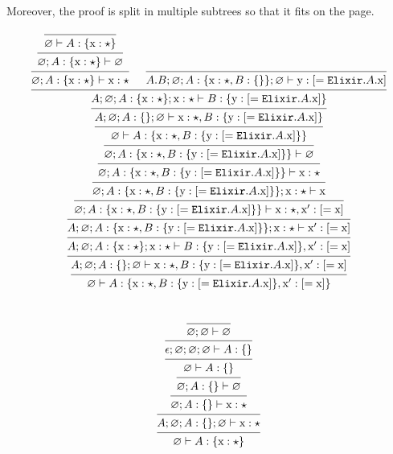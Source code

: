 \documentclass[12pt]{article}
\newcommand{\tx}{\text{\rm x}}
\newcommand{\ty}{\text{\rm y}}
\newcommand{\emptyenv}{\varnothing}
\newcommand{\Elixir}{\texttt{Elixir}}
\begin{document}
Moreover, the proof is split in multiple subtrees so that it fits on the page.

\[
    \begin{prooftree}
        \infer0{ \emptyenv \vdash A : \{ \tx : \star \} }
        \infer1{ \emptyenv; A : \{ \tx : \star \} \vdash \emptyenv }
        \infer1{ \emptyenv; A : \{ \tx : \star \} \vdash \tx : \star }

        \infer0{ A.B; \emptyenv; A : \{ \tx : \star, B : \{\} \}; \emptyenv \vdash \ty : [= \Elixir.A.\tx] }

        \infer2{ A; \emptyenv; A : \{ \tx : \star \}; \tx : \star \vdash B : \{ \ty : [= \Elixir.A.\tx] \} }
        \infer1{ A; \emptyenv; A : \{ \}; \emptyenv \vdash \tx : \star, B : \{ \ty : [= \Elixir.A.\tx] \} }
        \infer1{ \emptyenv \vdash A : \{ \tx : \star, B : \{ \ty : [= \Elixir.A.\tx] \} \} }
        \infer1{ \emptyenv; A : \{ \tx : \star, B : \{ \ty : [= \Elixir.A.\tx] \} \} \vdash \emptyenv }
        \infer1{ \emptyenv; A : \{ \tx : \star, B : \{ \ty : [= \Elixir.A.\tx] \} \} \vdash \tx : \star }
        \infer1{ \emptyenv; A : \{ \tx : \star, B : \{ \ty : [= \Elixir.A.\tx] \} \}; \tx : \star \vdash \tx}
        \infer1{ \emptyenv; A : \{ \tx : \star, B : \{ \ty : [= \Elixir.A.\tx] \} \} \vdash \tx : \star, \tx' : [= \tx] }
        \infer1{ A; \emptyenv; A : \{ \tx : \star, B : \{ \ty : [= \Elixir.A.\tx] \} \}; \tx : \star \vdash \tx' : [= \tx] }
        \infer1{ A; \emptyenv; A : \{ \tx : \star \}; \tx : \star \vdash B : \{ \ty : [= \Elixir.A.\tx] \}, \tx' : [= \tx] }
        \infer1{ A; \emptyenv; A : \{\}; \emptyenv \vdash  \tx : \star, B : \{ \ty : [= \Elixir.A.\tx] \}, \tx' : [= \tx] }
        \infer1{ \emptyenv \vdash A : \{ \tx : \star, B : \{ \ty : [= \Elixir.A.\tx] \}, \tx' : [= \tx] \} }
    \end{prooftree}
\] \\

\[
    \begin{prooftree}
        \infer0{ \emptyenv; \emptyenv \vdash \emptyenv }
        \infer1{ \epsilon; \emptyenv; \emptyenv; \emptyenv \vdash  A : \{\} }
        \infer1{ \emptyenv \vdash  A : \{\} }
        \infer1{ \emptyenv; A : \{\} \vdash \emptyenv }
        \infer1{ \emptyenv; A : \{\} \vdash \tx : \star }
        \infer1{ A; \emptyenv; A : \{\}; \emptyenv \vdash \tx : \star }
        \infer1{ \emptyenv \vdash A : \{ \tx : \star \} }
    \end{prooftree}
\]
\end{document}
